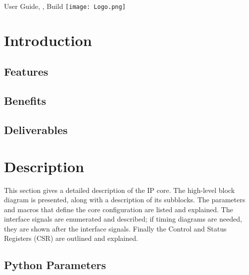 \documentclass{ug}
\date{\today}
\begin{document}
\maketitle
{}

\vspace*{\fill}
User Guide, , Build 
\hspace*{\fill} \texttt{[image: Logo.png]}

\cleardoublepage
{}
\setcounter{page}{1}

\cleardoublepage
\tableofcontents
\clearpage
\listoftables
\clearpage
\listoffigures
\cleardoublepage
{}
\setcounter{page}{1}
\section{Introduction}
\label{sec:intro}



\subsection{Features}
\label{sec:feat}


\subsection{Benefits}
\label{sec:benef}


\subsection{Deliverables}
\label{sec:deliv}


\ifdefined\SECTIONCLEARPAGE
\clearpage
\fi
\section{Description}

This section gives a detailed description of the IP core. The high-level block
diagram is presented, along with a description of its subblocks. The parameters and
macros that define the core configuration are listed and explained. The
interface signals are enumerated and described; if timing diagrams are needed,
they are shown after the interface signals. Finally the Control and Status
Registers (CSR) are outlined and explained.


\ifdefined\PYPARAMS
\subsection{Python Parameters}
\label{sec:py_params}

\fi
\end{document}
